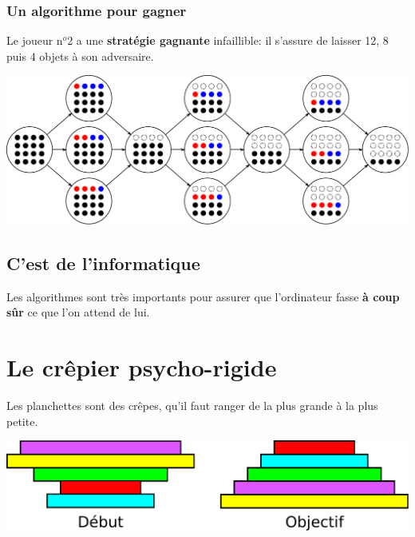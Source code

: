 \documentclass[a7paper,pagesize,DIV=14,10pt]{scrbook}
\begin{document}
\vspace{-.5\baselineskip}
\subsubsection*{Un algorithme pour gagner}

\vspace{-.5\baselineskip} %
Le joueur n$^o$2 a une \textbf{stratégie gagnante} infaillible: il
s'assure de laisser 12, 8 puis 4 objets à son adversaire.

\includegraphics[width=\linewidth]{img/nim16.pdf}

\subsection*{C'est de l'informatique}
\vspace{-.5\baselineskip} %
Les algorithmes sont très importants pour assurer que l'ordinateur
fasse \textbf{à coup sûr} ce que l'on attend de lui.

\newpage
\section*{Le crêpier psycho-rigide}

\vspace{-.5\baselineskip}
Les planchettes sont des crêpes, qu'il faut ranger de la plus grande à
la plus petite.

\smallskip
\includegraphics[width=\linewidth]{img/crepes_but-du-jeu.pdf}
\end{document}
